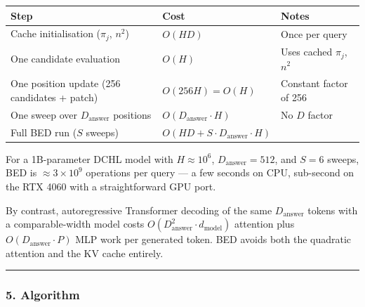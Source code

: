 \documentclass[
  11pt,
  a4paper,
]{article}
\begin{document}
\begin{longtable}[]{@{}
  >{\raggedright\arraybackslash}p{}
  >{\raggedright\arraybackslash}p{}
  >{\raggedright\arraybackslash}p{}@{}}
\toprule\noalign{}
\begin{minipage}[b]{\linewidth}\raggedright
Step
\end{minipage} & \begin{minipage}[b]{\linewidth}\raggedright
Cost
\end{minipage} & \begin{minipage}[b]{\linewidth}\raggedright
Notes
\end{minipage} \\
\midrule\noalign{}
\endhead
\bottomrule\noalign{}
\endlastfoot
Cache initialisation (\(\pi_j\), \(n^2\)) & \(O(HD)\) & Once per
query \\
One candidate evaluation & \(O(H)\) & Uses cached \(\pi_j\), \(n^2\) \\
One position update (256 candidates + patch) & \(O(256 H) = O(H)\) &
Constant factor of 256 \\
One sweep over \(D_{\text{answer}}\) positions &
\(O(D_{\text{answer}} \cdot H)\) & No \(D\) factor \\
Full BED run (\(S\) sweeps) &
\(O(HD + S \cdot D_{\text{answer}} \cdot H)\) & \\
\end{longtable}

For a 1B-parameter DCHL model with \(H \approx 10^6\),
\(D_{\text{answer}} = 512\), and \(S = 6\) sweeps, BED is
\(\approx 3 \times 10^9\) operations per query --- a few seconds on CPU,
sub-second on the RTX 4060 with a straightforward GPU port.

By contrast, autoregressive Transformer decoding of the same
\(D_{\text{answer}}\) tokens with a comparable-width model costs
\(O(D_{\text{answer}}^2 \cdot d_{\text{model}})\) attention plus
\(O(D_{\text{answer}} \cdot P)\) MLP work per generated token. BED
avoids both the quadratic attention and the KV cache entirely.

\begin{center}\rule{0.5\linewidth}{0.5pt}\end{center}

\subsubsection{5. Algorithm}\label{algorithm}
\end{document}
